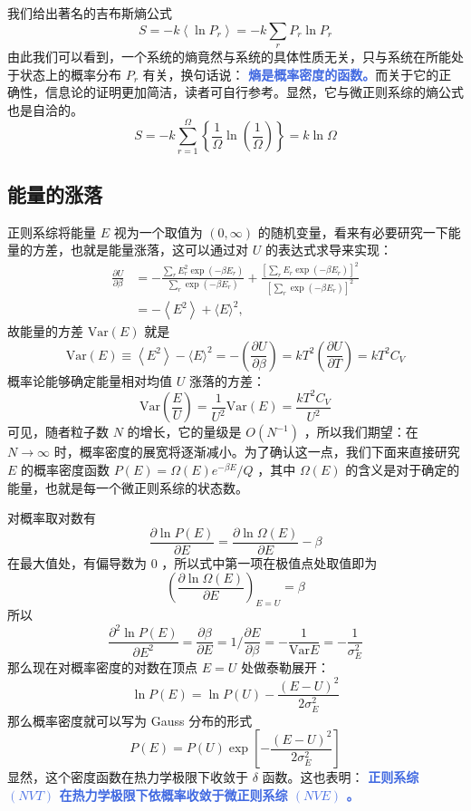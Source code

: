 我们给出著名的吉布斯熵公式
\begin{equation}\label{equ:GibbsS}
    S=-k\left\langle\ln P_r\right\rangle=-k \sum_r P_r \ln P_r
\end{equation}
由此我们可以看到，一个系统的熵竟然与系统的具体性质无关，只与系统在所能处于状态上的概率分布 $P_r$ 有关，换句话说： \textcolor{RoyalBlue}{\textbf{\kaishu 熵是概率密度的函数。}}而关于它的正确性，信息论的证明更加简洁，读者可自行参考。显然，它与微正则系综的熵公式也是自洽的。
\[
    S=-k \sum_{r=1}^{\Omega}\left\{\frac{1}{\Omega} \ln \left(\frac{1}{\Omega}\right)\right\}=k \ln \Omega
\]

\subsection{能量的涨落}

正则系综将能量 $E$ 视为一个取值为 $(0, \infty)$ 的随机变量，看来有必要研究一下能量的方差，也就是能量涨落，这可以通过对 $U$ 的表达式求导来实现：
\[
    \begin{aligned}
\frac{\partial U}{\partial \beta} & =-\frac{\sum_r E_r^2 \exp \left(-\beta E_r\right)}{\sum_r \exp \left(-\beta E_r\right)}+\frac{\left[\sum_r E_r \exp \left(-\beta E_r\right)\right]^2}{\left[\sum_r \exp \left(-\beta E_r\right)\right]^2} \\
& =-\left\langle E^2\right\rangle+\langle E\rangle^2,
\end{aligned}
\]
故能量的方差 $\text{Var}(E)$ 就是
\begin{equation}\label{equ:label}
    \text{Var}(E) \equiv\left\langle E^2\right\rangle-\langle E\rangle^2=-\left(\frac{\partial U}{\partial \beta}\right)=k T^2\left(\frac{\partial U}{\partial T}\right)=k T^2 C_V
\end{equation}
概率论能够确定能量相对均值 $U$ 涨落的方差：
\[
    \text{Var}\left(\frac{E}{U} \right) = \frac{1}{U^2} \text{Var}(E) = \frac{k T^2 C_V}{U^2} 
\]
可见，随者粒子数 $N$ 的增长，它的量级是 $O(N^{-1})$ ，所以我们期望：在 $N \rightarrow \infty$ 时，概率密度的展宽将逐渐减小。为了确认这一点，我们下面来直接研究 $E$ 的概率密度函数 $P(E) = \Omega(E)e^{-\beta E}/Q$ ，其中 $\Omega(E)$ 的含义是对于确定的能量，也就是每一个微正则系综的状态数。

对概率取对数有
\[
    \frac{\partial \ln P(E)}{\partial E} = \frac{\partial \ln \Omega (E)}{\partial E} - \beta
\]
在最大值处，有偏导数为 $0$ ，所以式中第一项在极值点处取值即为
\[
    \left(\frac{\partial \ln \Omega (E)}{\partial E}\right)_{E = U} = \beta
\]
所以
\[
    \frac{\partial^2 \ln P(E)}{\partial E^2} = \frac{\partial \beta}{\partial E} = 1\bigg/\frac{\partial E}{\partial \beta} = -\frac{1}{\text{Var}E}  = -\frac{1}{\sigma^2_E}
\]
那么现在对概率密度的对数在顶点 $E = U$ 处做泰勒展开：
\[
    \ln P(E) = \ln P(U) -\frac{(E - U)^2}{2\sigma^2_E}
\]
那么概率密度就可以写为 Gauss 分布的形式
\begin{equation}
    P(E) = P(U)\exp\left[-\frac{(E - U)^2}{2\sigma^2_E}\right]
\end{equation}
显然，这个密度函数在热力学极限下收敛于 $\delta$ 函数。这也表明： \textcolor{RoyalBlue}{\textbf{\kaishu 正则系综 $(NVT)$ 在热力学极限下依概率收敛于微正则系综 $(NVE)$ 。}}

